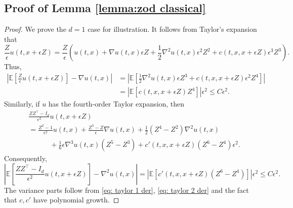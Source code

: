 \documentclass[twoside,11pt]{article}
\newcommand{\E}{\mathbb{E}}
\newcommand{\1}{\mathbf{1}}
\numberwithin{equation}{section}
\begin{document}
\subsection{Proof of Lemma \ref{lemma:zod classical}}
\begin{proof}
    We prove the $ d= 1$ case for illustration. It follows from Taylor's expansion that
    \begin{equation}\label{eq: taylor 1 der}
        \frac{Z}{\epsilon}u(t,x+\epsilon Z) = \frac{Z}{\epsilon}\left( u(t,x) + \nabla u(t,x)\epsilon Z + \frac{1}{2}\nabla^2u(t,x)\epsilon^2Z^2 + c(t,x,x + \epsilon Z)\epsilon^3Z^3\right).
    \end{equation}
    Thus,
    \begin{equation}
        \begin{aligned}
            \left|\E\left[ \frac{Z}{\epsilon} u(t,x+\epsilon Z)  \right]- \nabla u(t,x)\right|  &= \left| \E\left[ \frac{1}{2}\nabla^2 u(t,x)\epsilon Z^3 + c(t,x,x+\epsilon Z) \epsilon^2  Z^4\right]\right|\\
            & = \left| \E[c(t,x,x+\epsilon Z)Z^4]\right|\epsilon^2\le C\epsilon^2.
        \end{aligned}
    \end{equation}
    Similarly, if $ u$ has the fourth-order Taylor expansion, then
    \begin{equation}\label{eq: taylor 2 der}
        \begin{aligned}
            &\frac{ZZ^{\top}- I_d}{\epsilon^2}u(t,x+\epsilon Z) \\
            &=   \frac{Z^2 - 1}{\epsilon^2}u(t,x) + \frac{Z^3 - Z}{\epsilon}\nabla u(t,x) + \frac{1}{2}(Z^4 - Z^2)\nabla^2u(t,x)\\
            &\quad\quad\quad+ \frac{1}{6}\epsilon \nabla^3u(t,x)(Z^5 - Z^3)+c'(t,x,x+\epsilon Z)(Z^6 - Z^4)\epsilon^2.
        \end{aligned}
    \end{equation}
    Consequently,
    \begin{equation}
        \left|\E\left[\frac{ZZ^{\top}- I_d}{\epsilon^2}u(t,x+\epsilon Z) \right]- \nabla^2 u(t,x)\right| =  \left|\E[c'(t,x,x+\epsilon Z)(Z^6 - Z^4)]\right|\epsilon^2 \le C\epsilon^2.
    \end{equation}
    The variance parts follow from \eqref{eq: taylor 1 der}, \eqref{eq: taylor 2 der}  and the fact that $ c, c'$ have polynomial growth.
\end{proof}
\end{document}
